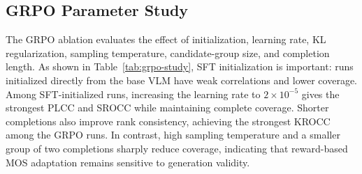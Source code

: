 \documentclass[10pt,twocolumn,letterpaper]{article}
\begin{document}
\subsection{GRPO Parameter Study}
The GRPO ablation evaluates the effect of initialization, learning rate, KL regularization, sampling temperature, candidate-group size, and completion length. As shown in Table~\ref{tab:grpo-study}, SFT initialization is important: runs initialized directly from the base VLM have weak correlations and lower coverage. Among SFT-initialized runs, increasing the learning rate to $2{\times}10^{-5}$ gives the strongest PLCC and SROCC while maintaining complete coverage. Shorter completions also improve rank consistency, achieving the strongest KROCC among the GRPO runs. In contrast, high sampling temperature and a smaller group of two completions sharply reduce coverage, indicating that reward-based MOS adaptation remains sensitive to generation validity.

\begin{table}[t]
  \centering
  \caption{GRPO ablation study over initialization, optimization, and generation settings.}
  \label{tab:grpo-study}
  \tiny
  \setlength{\tabcolsep}{1.4pt}
\end{table}
\end{document}
